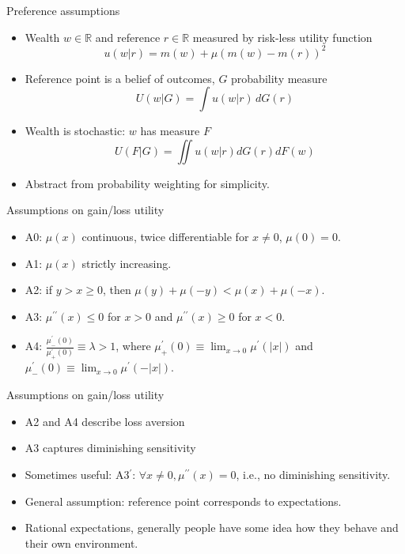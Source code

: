 \begin{frame}{Preference assumptions}
    \begin{itemize}
        \item Wealth $w \in \mathbb{R}$ and reference $r \in \mathbb{R}$ measured by risk-less utility function
               \[u(w | r) = m(w) + \mu ( m(w) - m(r) )^2\]
                \item Reference point is a belief of outcomes, $G$ probability measure
         \[U(w | G)=\int u(w|r)  \,dG(r)\]
        \item Wealth is stochastic: $w$ has measure $F$
        \[U(F|G)=\iint u(w | r) dG(r) dF(w)\]
        \item Abstract from probability weighting for simplicity.\medskip
	\end{itemize}
\end{frame}


\begin{frame}{Assumptions on gain/loss utility}
    \begin{itemize}
        \item A0: $\mu(x) $ continuous, twice differentiable for $x\neq 0$, $\mu(0)=0 $.\medskip
        \item A1: $ \mu(x)$ strictly increasing. \medskip
        \item A2: if $y>x\geq 0 $, then $\mu(y)+\mu(-y) <\mu(x) +\mu(-x) $.\medskip
    \item A3: $ \mu^{\prime\prime}(x) \leq 0 $ for $ x>0$ and $\mu^{\prime\prime}(x) \geq 0$ for $ x<0 $.\medskip
        \item A4: $\frac{\mu^{'}_{-}(0)}{\mu^{'}_{+}(0)} \equiv \lambda >1 $,
    where $ \mu^{\prime}_{+}(0) \equiv \lim_{x \to 0} \mu^{\prime}(\left\lvert x \right \rvert )$ and $ \mu^{\prime}_{-}(0) \equiv \lim_{x \to 0} \mu^{\prime}(-\left\lvert x \right\rvert )$.\medskip
	\end{itemize}
\end{frame}




\begin{frame}{Assumptions on gain/loss utility}
    \begin{itemize}
 	\item A2 and A4 describe loss aversion\medskip
        \item A3 captures diminishing sensitivity\medskip
        \item Sometimes useful: A3$^{\prime}$: $\forall x \neq 0, \mu^{\prime \prime}(x)=0$, i.e., no diminishing sensitivity.\medskip
        \item General assumption: reference point corresponds to expectations.\medskip
        \item Rational expectations, generally people have some idea how they behave and their own environment.\medskip
	\end{itemize}
\end{frame}


